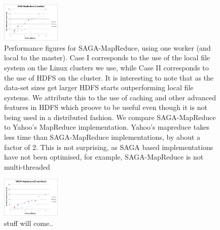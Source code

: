 \documentclass[conference,final]{IEEEtran}
\newcommand{\jhanote}[1]{ {\textcolor{red} { ***SJ: #1 }}}
\newcommand{\jhanote}[1]{}
\newcommand{\sagamapreduce }{SAGA-MapReduce }
\begin{document}
\begin{figure}[t]
      \centering
          \includegraphics[width=0.25\textwidth]{saga_mapreduce_1worker.png}
          \caption{Performance figures for SAGA-MapReduce, using one
            worker (and local to the master). %
            Case I corresponds to the use of the local file system on
            the Linux clusters we use, while Case II corresponds to
            the use of HDFS on the cluster.  It is interesting to note
            that as the data-set sizes get larger HDFS starts
            outperforming local file systems.  We attribute this to
            the use of caching and other advanced features in HDFS
            which proove to be useful even though it is not being used
            in a distributed fashion. We compare \sagamapreduce to
            Yahoo's MapReduce implementation. %
            Yahoo's mapreduce takes less time than \sagamapreduce
            implementations, by about a factor of 2. This is not
            surprising, as SAGA based implementations have not been
            optimised, for example, \sagamapreduce is not
            multi-threaded}
      \label{saga_mapreduce_1worker.png}
\end{figure}

\begin{figure}[t]
      \centering
          \includegraphics[width=0.25\textwidth]{saga_mapreduce_3workers.png}
          \caption{stuff will come..}
      \label{saga_mapreduce_3workers.png}
\end{figure}
\end{document}
